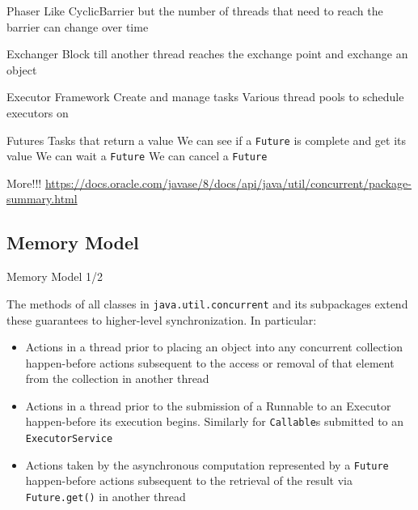 \documentclass[
14pt,
aspectratio=169,
usenames,
dvipsnames,
x11names]{beamer}
\begin{document}
\begin{frame}{Phaser}
  Like CyclicBarrier but the number of threads that need to reach the barrier can change over time
\end{frame}

\begin{frame}{Exchanger}
  Block till another thread reaches the exchange point and exchange an object
\end{frame}

\begin{frame}{Executor Framework}
  Create and manage tasks
  \vfill
  Various thread pools to schedule executors on
\end{frame}

\begin{frame}{Futures}
  Tasks that return a value
  \vfill
  We can see if a \texttt{Future} is complete and get its value
  \vfill
  We can wait a \texttt{Future}
  \vfill
  We can cancel a \texttt{Future}
\end{frame}

\begin{frame}{More!!!}
\url{https://docs.oracle.com/javase/8/docs/api/java/util/concurrent/package-summary.html}
\end{frame}

\subsection{Memory Model}

\begin{frame}{Memory Model 1/2}
  \small

  The methods of all classes in \texttt{java.util.concurrent} and its
  subpackages extend these guarantees to higher-level
  synchronization. In particular:

  \begin{itemize}
  \item Actions in a thread prior to placing an object into any
    concurrent collection \alert{happen-before} actions subsequent to the access
    or removal of that element from the collection in another thread

  \item Actions in a thread prior to the submission of a Runnable to an
    Executor \alert{happen-before} its execution begins. Similarly for
    \texttt{Callable}s submitted to an \texttt{ExecutorService}

  \item Actions taken by the asynchronous computation represented by a
    \texttt{Future} \alert{happen-before} actions subsequent to the
    retrieval of the result via \texttt{Future.get()} in another thread
  \end{itemize}
\end{frame}
\end{document}

